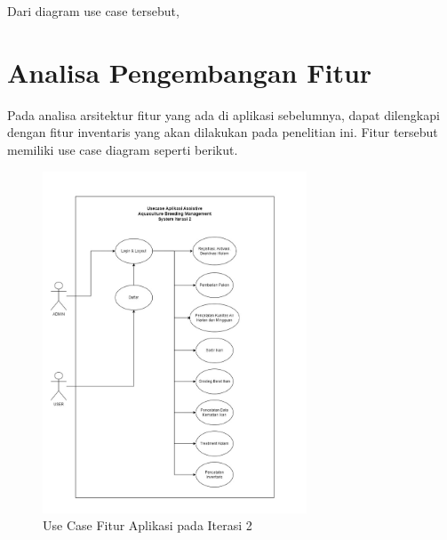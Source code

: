 Dari diagram use case tersebut, 

\section{Analisa Pengembangan Fitur}

Pada analisa arsitektur fitur yang ada di aplikasi sebelumnya, dapat dilengkapi dengan fitur inventaris yang akan dilakukan pada penelitian ini. Fitur tersebut memiliki use case diagram seperti berikut.

\begin{figure}[H]
	\centering
	\includegraphics[width=0.7\textwidth]{gambar/akbar/usecase_iterasi_2.jpeg}
	\caption{Use Case Fitur Aplikasi pada Iterasi 2}
\end{figure}






